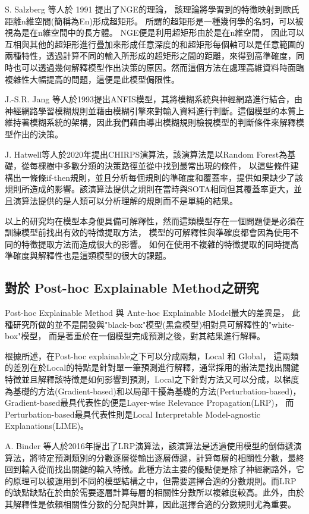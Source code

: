 \documentclass[class=NCU_thesis, crop=false]{standalone}
\begin{document}
S. Salzberg 等人於 1991 提出了NGE\cite{salzberg1991nearest}的理論，
該理論將學習到的特徵映射到歐氏距離n維空間(簡稱為En)形成超矩形。
所謂的超矩形是一種幾何學的名詞，可以被視為是在n維空間中的長方體。
NGE便是利用超矩形由於是在n維空間，
因此可以互相與其他的超矩形進行疊加來形成任意深度的和超矩形每個軸可以是任意範圍的兩種特性，透過計算不同的輸入所形成的超矩形之間的距離，來得到高準確度，同時也可以透過幾何解釋模型作出決策的原因。然而這個方法在處理高維資料時面臨複雜性大幅提高的問題，這便是此模型侷限性。

J.-S.R. Jang 等人於1993提出ANFIS模型\cite{256541}，其將模糊系統與神經網路進行結合，由神經網路學習模糊規則並藉由模糊引擎來對輸入資料進行判斷。這個模型的本質上維持著模糊系統的架構，因此我們藉由導出模糊規則檢視模型的判斷條件來解釋模型作出的決策。

J. Hatwell等人於2020年提出CHIRPS演算法\cite{hatwell2020chirps}，該演算法是以Random Forest為基礎，從每棵樹中多數分類的決策路徑並從中找到最常出現的條件，
以這些條件建構出一條條if-then規則，並且分析每個規則的準確度和覆蓋率，提供如果缺少了該規則所造成的影響。該演算法提供之規則在當時與SOTA相同但其覆蓋率更大，並且演算法提供的是人類可以分析理解的規則而不是單純的結果。

以上的研究均在模型本身便具備可解釋性，然而這類模型存在一個問題便是必須在訓練模型前找出有效的特徵提取方法，
模型的可解釋性與準確度都會因為使用不同的特徵提取方法而造成很大的影響。
如何在使用不複雜的特徵提取的同時提高準確度與解釋性也是這類模型的很大的課題。

\subsection{對於 Post-hoc Explainable Method之研究}
Post-hoc Explainable Method 與 Ante-hoc Explainable Model最大的差異是，
此種研究所做的並不是開發與"black-box"模型(黑盒模型)相對具可解釋性的"white-box"模型，
而是著重於在一個模型完成預測之後，對其結果進行解釋。

根據\cite{Nielsen_2022}所述，在Post-hoc explainable之下可以分成兩類，Local 和 Global，
這兩類的差別在於Local的特點是針對單一筆預測進行解釋，通常採用的辦法是找出關鍵特徵並且解釋該特徵是如何影響到預測，Local之下針對方法又可以分成，以梯度為基礎的方法(Gradient-based)和以局部干擾為基礎的方法(Perturbation-based)，
Gradient-based最具代表性的便是Layer-wise Relevance Propagation(LRP)\cite{10.1007/978-3-319-44781-0_8}，
而Perturbation-based最具代表性則是Local Interpretable Model-agnostic Explanations(LIME)\cite{10.1145/2939672.2939778}。

A. Binder 等人於2016年提出了LRP演算法\cite{10.1007/978-3-319-44781-0_8}，該演算法是透過使用模型的倒傳遞演算法，將特定預測類別的分數逐層從輸出逐層傳遞，計算每層的相關性分數，最終回到輸入從而找出關鍵的輸入特徵。此種方法主要的優點便是除了神經網路外，它的原理可以被運用到不同的模型結構之中，但需要選擇合適的分數規則。而LRP的缺點缺點在於由於需要逐層計算每層的相關性分數所以複雜度較高。此外，由於其解釋性是依賴相關性分數的分配與計算，因此選擇合適的分數規則尤為重要。
\end{document}
